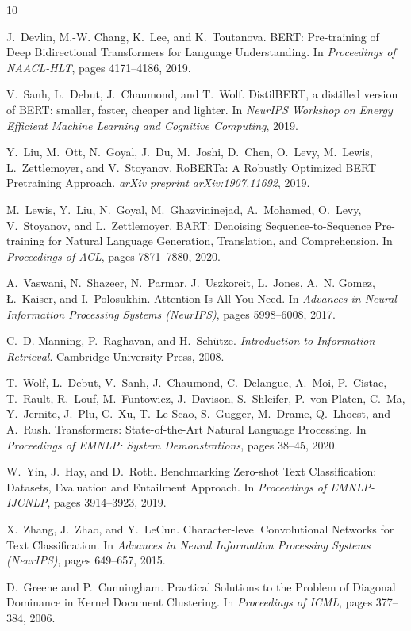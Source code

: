 \documentclass[12pt, a4paper]{article}
\begin{document}
\begin{thebibliography}{10}

J.~Devlin, M.-W. Chang, K.~Lee, and K.~Toutanova.
\newblock BERT: Pre-training of Deep Bidirectional Transformers for Language Understanding.
\newblock In \textit{Proceedings of NAACL-HLT}, pages 4171--4186, 2019.

V.~Sanh, L.~Debut, J.~Chaumond, and T.~Wolf.
\newblock DistilBERT, a distilled version of BERT: smaller, faster, cheaper and lighter.
\newblock In \textit{NeurIPS Workshop on Energy Efficient Machine Learning and Cognitive Computing}, 2019.

Y.~Liu, M.~Ott, N.~Goyal, J.~Du, M.~Joshi, D.~Chen, O.~Levy, M.~Lewis, L.~Zettlemoyer, and V.~Stoyanov.
\newblock RoBERTa: A Robustly Optimized BERT Pretraining Approach.
\newblock \textit{arXiv preprint arXiv:1907.11692}, 2019.

M.~Lewis, Y.~Liu, N.~Goyal, M.~Ghazvininejad, A.~Mohamed, O.~Levy, V.~Stoyanov, and L.~Zettlemoyer.
\newblock BART: Denoising Sequence-to-Sequence Pre-training for Natural Language Generation, Translation, and Comprehension.
\newblock In \textit{Proceedings of ACL}, pages 7871--7880, 2020.

A.~Vaswani, N.~Shazeer, N.~Parmar, J.~Uszkoreit, L.~Jones, A.~N. Gomez, \L.~Kaiser, and I.~Polosukhin.
\newblock Attention Is All You Need.
\newblock In \textit{Advances in Neural Information Processing Systems (NeurIPS)}, pages 5998--6008, 2017.

C.~D. Manning, P.~Raghavan, and H.~Sch\"utze.
\newblock \textit{Introduction to Information Retrieval}.
\newblock Cambridge University Press, 2008.

T.~Wolf, L.~Debut, V.~Sanh, J.~Chaumond, C.~Delangue, A.~Moi, P.~Cistac, T.~Rault, R.~Louf, M.~Funtowicz, J.~Davison, S.~Shleifer, P.~von Platen, C.~Ma, Y.~Jernite, J.~Plu, C.~Xu, T.~Le Scao, S.~Gugger, M.~Drame, Q.~Lhoest, and A.~Rush.
\newblock Transformers: State-of-the-Art Natural Language Processing.
\newblock In \textit{Proceedings of EMNLP: System Demonstrations}, pages 38--45, 2020.

W.~Yin, J.~Hay, and D.~Roth.
\newblock Benchmarking Zero-shot Text Classification: Datasets, Evaluation and Entailment Approach.
\newblock In \textit{Proceedings of EMNLP-IJCNLP}, pages 3914--3923, 2019.

X.~Zhang, J.~Zhao, and Y.~LeCun.
\newblock Character-level Convolutional Networks for Text Classification.
\newblock In \textit{Advances in Neural Information Processing Systems (NeurIPS)}, pages 649--657, 2015.

D.~Greene and P.~Cunningham.
\newblock Practical Solutions to the Problem of Diagonal Dominance in Kernel Document Clustering.
\newblock In \textit{Proceedings of ICML}, pages 377--384, 2006.

\end{thebibliography}
\end{document}
